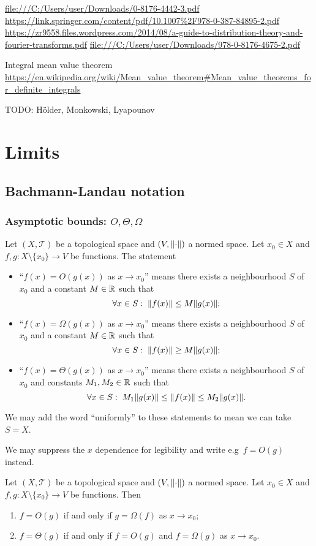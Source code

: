 \url{file:///C:/Users/user/Downloads/0-8176-4442-3.pdf}
\url{https://link.springer.com/content/pdf/10.1007%2F978-0-387-84895-2.pdf}
\url{https://zr9558.files.wordpress.com/2014/08/a-guide-to-distribution-theory-and-fourier-transforms.pdf}
\url{file:///C:/Users/user/Downloads/978-0-8176-4675-2.pdf}

Integral mean value theorem \url{https://en.wikipedia.org/wiki/Mean_value_theorem#Mean_value_theorems_for_definite_integrals}

TODO: Hölder, Monkowski, Lyapounov

\chapter{Limits}

\section{Bachmann-Landau notation}
\subsection{Asymptotic bounds: $O, \Theta, \Omega$}
\begin{definition}
Let $(X,\mathcal{T})$ be a topological space and $(V,\lVert\cdot\rVert)$ a normed space. Let $x_0 \in X$ and $f,g: X\setminus\{x_0\}\to V$ be functions. The statement
\begin{itemize}
\item ``$f(x) = O(g(x))$ as $x\to x_0$'' means there exists a neighbourhood $S$ of $x_0$ and a constant $M\in\mathbb{R}$ such that
\[ \forall x\in S:\; \lVert f(x)\rVert \leq M\lVert g(x)\rVert; \]
\item ``$f(x) = \Omega(g(x))$ as $x\to x_0$'' means there exists a neighbourhood $S$ of $x_0$ and a constant $M\in\mathbb{R}$ such that
\[ \forall x\in S:\; \lVert f(x)\rVert \geq M\lVert g(x)\rVert; \]
\item ``$f(x) = \Theta(g(x))$ as $x\to x_0$'' means there exists a neighbourhood $S$ of $x_0$ and constants $M_1,M_2\in\mathbb{R}$ such that
\[ \forall x\in S:\; M_1\lVert g(x)\rVert \leq \lVert f(x)\rVert \leq M_2\lVert g(x)\rVert. \]
\end{itemize}
We may add the word ``uniformly'' to these statements to mean we can take $S=X$.

We may suppress the $x$ dependence for legibility and write e.g\ $f = O(g)$ instead.
\end{definition}

\begin{lemma}
Let $(X,\mathcal{T})$ be a topological space and $(V,\lVert\cdot\rVert)$ a normed space. Let $x_0 \in X$ and $f,g: X\setminus\{x_0\}\to V$ be functions. Then
\begin{enumerate}
\item $f = O(g)$ \textup{if and only if} $g = \Omega(f)$ as $x\to x_0$;
\item $f = \Theta(g)$ \textup{if and only if} $f = O(g)$ and $f = \Omega(g)$ as $x\to x_0$.
\end{enumerate}
\end{lemma}

